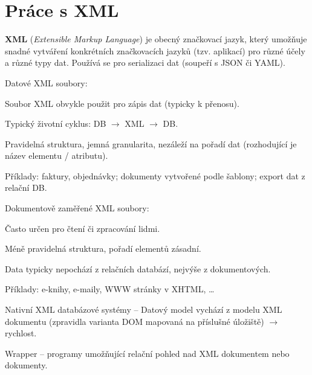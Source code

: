
\section{Práce s XML}

\begin{compactitem}
    \item \textbf{XML} (\textit{Extensible Markup Language}) je obecný značkovací jazyk, který umožňuje snadné vytváření konkrétních značkovacích jazyků (tzv. aplikací) pro různé účely a různé typy dat. Používá se pro serializaci dat (soupeří s JSON či YAML).

    \item Datové XML soubory: \begin{compactitem}
        \item Soubor XML obvykle použit pro zápis dat (typicky k přenosu).
        \item Typický životní cyklus: DB $\rightarrow$ XML $\rightarrow$ DB.
        \item Pravidelná struktura, jemná granularita, nezáleží na pořadí dat (rozhodující je název elementu / atributu).
        \item Příklady: faktury, objednávky; dokumenty vytvořené podle šablony; export dat z relační DB.
    \end{compactitem}

    \item Dokumentově zaměřené XML soubory: \begin{compactitem}
        \item Často určen pro čtení či zpracování lidmi.
        \item Méně pravidelná struktura, pořadí elementů zásadní.
        \item Data typicky nepochází z relačních databází, nejvýše z dokumentových.
        \item Příklady: e-knihy, e-maily, WWW stránky v XHTML, \dots
    \end{compactitem}

    \item Nativní XML databázové systémy -- Datový model vychází z modelu XML dokumentu (zpravidla varianta DOM mapovaná na příslušné úložiště) $\rightarrow$ rychlost.

    \item Wrapper -- programy umožňující relační pohled nad XML dokumentem nebo dokumenty.
\end{compactitem}

